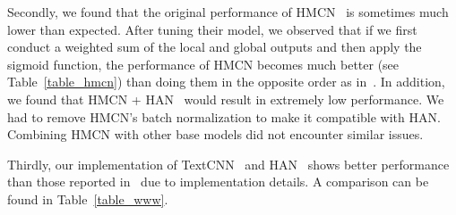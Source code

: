 \documentclass[11pt,a4paper]{article}
\begin{document}
Secondly, we found that the original performance of HMCN~\citep{wehrmann2018hierarchical} is sometimes much lower than expected.
After tuning their model, we observed that if we first conduct a weighted sum of the local and global outputs and then apply the sigmoid function, the performance of HMCN becomes much better (see Table~\ref{table_hmcn}) than doing them in the opposite order as in~\citet{wehrmann2018hierarchical}.
In addition, we found that HMCN + HAN~\citep{yang2016hierarchical} would result in extremely low performance. We had to remove HMCN's batch normalization to make it compatible with HAN.
Combining HMCN with other base models did not encounter similar issues.

\begin{table*}[t]
    \caption{Comparison of different implementations of HMCN.} 
    \label{table_hmcn}
    \centering
\end{table*}

Thirdly, our implementation of TextCNN~\citep{kim2014convolutional} and HAN~\citep{yang2016hierarchical} shows better performance than those reported in~\citet{peng2018large} due to implementation details. A comparison can be found in Table~\ref{table_www}.


\begin{table}[t]
    \caption{Comparison of different implementations of HAN and TextCNN on the RCV1 dataset.} 
    \label{table_www}
    \centering
\end{table}
\end{document}
